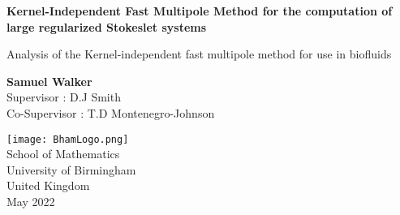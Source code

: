 \begin{titlepage}
    \begin{center}
        \vspace*{1cm}

        \LARGE
        \textbf{Kernel-Independent Fast Multipole Method for the computation of large regularized Stokeslet systems}

        \normalsize
        \vspace{0.5cm}
        Analysis of the Kernel-independent fast multipole method for use in biofluids
        
        \vspace{1.5cm}
        
        \textbf{Samuel Walker}\\
        Supervisor : D.J Smith \\
        Co-Supervisor : T.D Montenegro-Johnson
        
        \vfill
        
        \vspace{0.8cm}
        
        \texttt{[image: BhamLogo.png]}\\
        
        \normalsize
        School of Mathematics\\
        University of Birmingham\\
        United Kingdom\\
        May 2022
            
    \end{center}
\end{titlepage}




